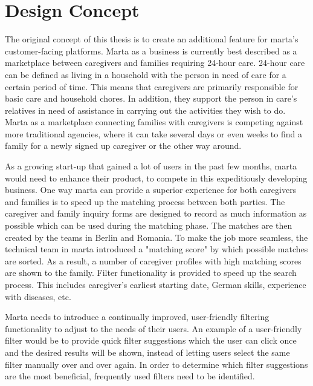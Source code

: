 \section{Design Concept}
The original concept of this thesis is to create an additional feature for marta's customer-facing platforms. Marta as a business is currently best described as a marketplace between caregivers and families requiring 24-hour care. 24-hour care can be defined as living in a household with the person in need of care for a certain period of time. This means that caregivers are primarily responsible for basic care and household chores. In addition, they support the person in care's relatives in need of assistance in carrying out the activities they wish to do. Marta as a marketplace connecting families with caregivers is competing against more traditional agencies, where it can take several days or even weeks to find a family for a newly signed up caregiver or the other way around.

As a growing start-up that gained a lot of users in the past few months, marta would need to enhance their product, to compete in this expeditiously developing business. One way marta can provide a superior experience for both caregivers and families is to speed up the matching process between both parties. The caregiver and family inquiry forms are designed to record as much information as possible which can be used during the matching phase. The matches are then created by the teams in Berlin and Romania. To make the job more seamless, the technical team in marta introduced a "matching score" by which possible matches are sorted. As a result, a number of caregiver profiles with high matching scores are shown to the family. Filter functionality is provided to speed up the search process. This includes caregiver's earliest starting date, German skills, experience with diseases, etc.

Marta needs to introduce a continually improved, user-friendly filtering functionality to adjust to the needs of their users. An example of a user-friendly filter would be to provide quick filter suggestions which the user can click once and the desired results will be shown, instead of letting users select the same filter manually over and over again. In order to determine which filter suggestions are the most beneficial, frequently used filters need to be identified.


